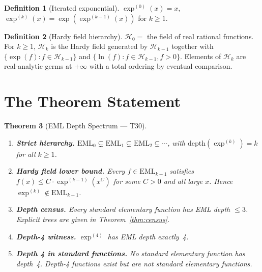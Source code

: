 \documentclass[12pt,a4paper]{article}
\newtheorem{theorem}{Theorem}[section]
\theoremstyle{definition}
\newtheorem{definition}[theorem]{Definition}
\theoremstyle{remark}
\begin{document}
\begin{definition}[Iterated exponential]\label{def:iterexp}
$\exp^{(0)}(x) = x$, $\exp^{(k)}(x) = \exp(\exp^{(k-1)}(x))$ for $k \geq 1$.
\end{definition}

\begin{definition}[Hardy field hierarchy]\label{def:hardy}
$\mathcal{H}_0 = $ the field of real rational functions.  For $k \geq 1$,
$\mathcal{H}_k$ is the Hardy field generated by $\mathcal{H}_{k-1}$ together
with $\{\exp(f) : f \in \mathcal{H}_{k-1}\}$ and $\{\ln(f) : f \in \mathcal{H}_{k-1},
f > 0\}$.  Elements of $\mathcal{H}_k$ are real-analytic germs at $+\infty$
with a total ordering by eventual comparison.
\end{definition}

\section{The Theorem Statement}

\begin{theorem}[EML Depth Spectrum --- T30]\label{thm:T30}
\mbox{}
\begin{enumerate}
  \item[\textbf{(a)}] \textbf{Strict hierarchy.}
        $\mathrm{EML}_0 \subsetneq \mathrm{EML}_1 \subsetneq \mathrm{EML}_2
        \subsetneq \cdots$, with $\mathrm{depth}(\exp^{(k)}) = k$ for all $k \geq 1$.

  \item[\textbf{(b)}] \textbf{Hardy field lower bound.}
        Every $f \in \mathrm{EML}_{k-1}$ satisfies
        $f(x) \leq C \cdot \exp^{(k-1)}(x^C)$ for some $C > 0$ and all large $x$.
        Hence $\exp^{(k)} \notin \mathrm{EML}_{k-1}$.

  \item[\textbf{(c)}] \textbf{Depth census.}
        Every standard elementary function has EML depth $\leq 3$.
        Explicit trees are given in Theorem~\ref{thm:census}.

  \item[\textbf{(d)}] \textbf{Depth-4 witness.}
        $\exp^{(4)}$ has EML depth exactly~4.

  \item[\textbf{(e)}] \textbf{Depth 4 in standard functions.}
        No standard elementary function has depth~4.
        Depth-4 functions exist but are not standard elementary functions.
\end{enumerate}
\end{theorem}
\end{document}
